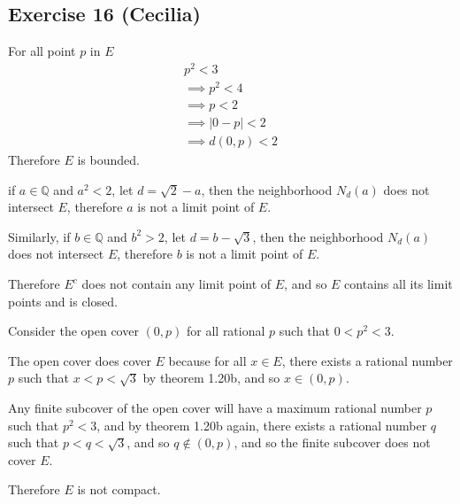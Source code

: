 \subsection*{Exercise 16 (Cecilia)}
For all point $ p $ in $ E $
\begin{eqnarray*}
  p^2 < 3 \\
  \implies p^2 < 4 \\
  \implies p < 2 \\
  \implies |0 - p| < 2 \\
  \implies d(0, p) < 2
\end{eqnarray*}
Therefore $ E $ is bounded.

if $ a \in \mathbb{Q} $ and $ a^2 < 2 $, let $ d = \sqrt{2} - a $, then the neighborhood $ N_d(a) $ does not intersect $ E $, therefore $ a $ is not a limit point of $ E $.

Similarly, if $ b \in \mathbb{Q} $ and $ b^2 > 2 $, let $ d = b - \sqrt{3} $, then the neighborhood $ N_d(a) $ does not intersect $ E $, therefore $ b $ is not a limit point of $ E $.

Therefore $ E^c $ does not contain any limit point of $ E $, and so $ E $ contains all its limit points and is closed.

Consider the open cover $ (0, p) $ for all rational $ p $ such that $ 0 < p^2 < 3 $. 

The open cover does cover $ E $ because for all $ x \in E $, there exists a rational number $ p $ such that $ x < p < \sqrt{3} $ by theorem 1.20b, and so $ x \in (0, p) $.

Any finite subcover of the open cover will have a maximum rational number $ p $ such that $ p^2 < 3 $, and by theorem 1.20b again, there exists a rational number $ q $ such that $ p < q < \sqrt{3} $, and so $ q \notin (0, p) $, and so the finite subcover does not cover $ E $.

Therefore $ E $ is not compact.